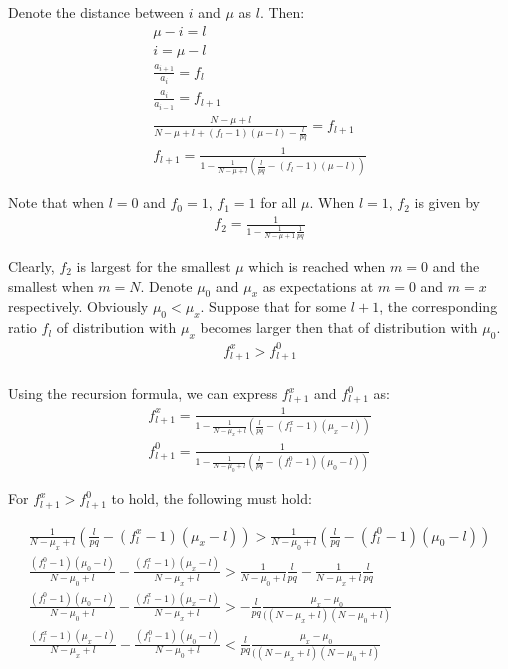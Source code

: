 \documentclass[11pt,draft]{article}
\begin{document}
Denote the distance between $i$ and $\mu$ as $l$.  Then:
\begin{align}
\mu - i = l\\
i = \mu -l \\
\frac{a_{i+1}}{a_{i}} = f_l \\
\frac{a_{i}}{a_{i-1}} = f_{l+1} \\
\frac{   N - \mu + l}{ N - \mu + l  + (f_l - 1)(\mu-l)  - \frac{l}{pq}   } =  f_{l+1}  \\
 f_{l+1} =  \frac{  1 }{ 1  - \frac{1}{N-\mu + l}(\frac{l}{pq} - (f_l - 1)(\mu - l)) } 
\end{align}

Note that when $l=0$  and $f_0=1$, $f_1 = 1$ for all $\mu$.  When $l=1$, $f_2$ is given by
\begin{align}
f_{2} =  \frac{  1 }{ 1  - \frac{1}{N-\mu + 1}\frac{1}{pq} } 
\end{align}

Clearly,  $f_2$ is largest for the smallest $\mu$ which is reached when $m=0$ and the smallest when $m=N$.
Denote $\mu_0$ and $\mu_x$ as expectations at $m=0$ and $m=x$ respectively.  Obviously  $\mu_0 < \mu_x$.
Suppose that for some $l+1$,  the corresponding ratio $f_l$ of distribution with $\mu_x$ becomes larger then that of distribution with $\mu_0$.
\begin{align}
f^x_{l+1} > f^0_{l+1} \\
\end{align}

Using the recursion formula, we can express  $f^x_{l+1}$ and  $f^0_{l+1}$ as:
\begin{align}
f^x_{l+1} = \frac{  1 }{ 1  - \frac{1}{N-\mu_x + l}(\frac{l}{pq} - (f^x_l - 1)(\mu_x - l)) } \\
f^0_{l+1} = \frac{  1 }{ 1  - \frac{1}{N-\mu_0 + l}(\frac{l}{pq} - (f^0_l - 1)(\mu_0 - l)) }
\end{align}

For $f^x_{l+1}  > f^0_{l+1}$ to hold, the following must hold:

\begin{align}
\frac{1}{N-\mu_x + l}(\frac{l}{pq} - (f^x_l - 1)(\mu_x - l)) >  \frac{1}{N-\mu_0 + l}(\frac{l}{pq} - (f^0_l - 1)(\mu_0 - l))  \\
\frac{(f^0_l - 1)(\mu_0 - l)}{N-\mu_0 + l} - \frac{(f^x_l - 1)(\mu_x - l)}{N-\mu_x + l} > \frac{1}{N-\mu_0 + l} \frac{l}{pq}  - \frac{1}{N-\mu_x + l}\frac{l}{pq}   \\
\frac{(f^0_l - 1)(\mu_0 - l)}{N-\mu_0 + l} - \frac{(f^x_l - 1)(\mu_x - l)}{N-\mu_x + l} > - \frac{l}{pq} \frac{\mu_x - \mu_0}{((N-\mu_x + l)(N-\mu_0 + l)} \\
\frac{(f^x_l - 1)(\mu_x - l)}{N-\mu_x + l}  - \frac{(f^0_l - 1)(\mu_0 - l)}{N-\mu_0 + l} < \frac{l}{pq} \frac{\mu_x - \mu_0}{((N-\mu_x + l)(N-\mu_0 + l)}
\end{align}
\end{document}
